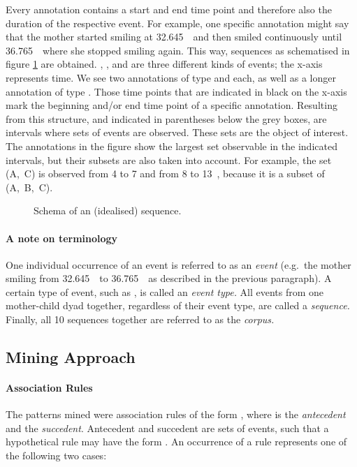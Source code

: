 Every annotation contains a start and end time point and therefore also the duration of the respective event.
For example, one specific annotation might say that the mother started smiling at 32.645~\s\ and then smiled continuously until 36.765~\s\, where she stopped smiling again.
This way, sequences as schematised in figure \ref{fig:idealseq} are obtained.
, , and  are three different kinds of events; the x-axis represents time.
We see two annotations of type  and  each, as well as a longer annotation of type .
Those time points that are indicated in black on the x-axis mark the beginning and/or end time point of a specific annotation.
Resulting from this structure, and indicated in parentheses below the grey boxes, are intervals where sets of events are observed.
These sets are the object of interest.
The annotations in the figure show the largest set observable in the indicated intervals, but their subsets are also taken into account.
For example, the set (A,~C) is observed from 4 to 7 and from 8 to 13~\s, because it is a subset of (A,~B,~C).

\begin{figure}
	\centering
	
	\label{fig:idealseq}
	\caption[Sequence schema.]{Schema of an (idealised) sequence.}
\end{figure}

\paragraph{A note on terminology}
One individual occurrence of an event is referred to as an \emph{event} (e.g.~the mother smiling from 32.645~\s\ to 36.765~\s\ as described in the previous paragraph).
A certain type of event, such as \code{\mosm}, is called an \emph{event type.}
All events from one mother-child dyad together, regardless of their event type, are called a \emph{sequence.}
Finally, all 10 sequences together are referred to as the \emph{corpus.}


\subsection{Mining Approach}
\label{ssec:fpmmetapp}
\paragraph{Association Rules}
The patterns \citet{rohlfing_multimodal_underreview} mined were association rules of the form , where  is the \emph{antecedent} and  the \emph{succedent}.
Antecedent and succedent are sets of events, such that a hypothetical rule may have the form .
An occurrence of a rule represents one of the following two cases:

